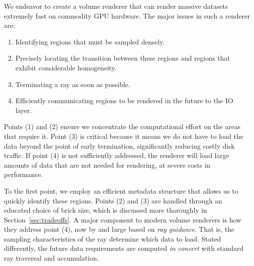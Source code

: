 We endeavor to create a volume renderer that can render massive 
datasets extremely fast on commodity GPU hardware.  The major issues in
such a renderer are:
\begin{enumerate}
  \itemsep0em
  \item Identifying regions that must be sampled densely.

  \item Precisely locating the transition between these regions and
  regions that exhibit considerable homogeneity.

  \item Terminating a ray as soon as possible.

  \item Efficiently communicating regions to be rendered in the future
  to the IO layer.

\end{enumerate}

Points (1) and (2) ensure we concentrate the computational effort on
the areas that require it.  Point (3) is critical because it means we
do not have to load the data beyond the point of early termination,
significantly reducing costly disk traffic.  If point (4) is not
sufficiently addressed, the renderer will load large amounts of data
that are not needed for rendering, at severe costs in performance.


To the first point, we employ an efficient metadata structure that
allows us to quickly identify these regions.  Points (2) and (3) are
handled through an educated choice of brick size, which is discussed
more thoroughly in Section~\ref{sec:tradeoffs}.  A major component to
modern volume renderers is how they address point (4), now by and large
based on \emph{ray guidance}.  That is, the sampling characteristics of
the ray determine which data to load.  Stated differently, the future
data requirements are computed \emph{in concert} with standard ray
traversal and accumulation.


